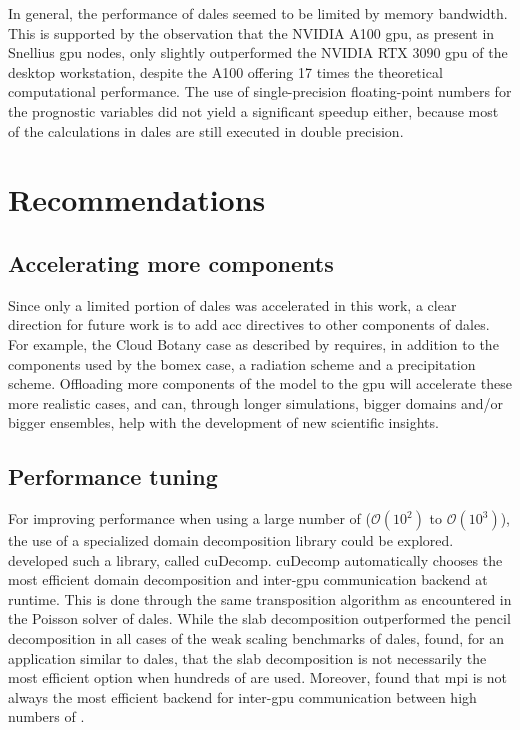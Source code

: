 In general, the performance of \acrshort{dales} seemed to be limited by memory bandwidth. This is supported by the observation that the NVIDIA A100 \acrshort{gpu}, as present in Snellius \acrshort{gpu} nodes, only slightly outperformed the NVIDIA RTX 3090 \acrshort{gpu} of the desktop workstation, despite the A100 offering 17 times the theoretical computational performance. The use of single-precision floating-point numbers for the prognostic variables did not yield a significant speedup either, because most of the calculations in \acrshort{dales} are still executed in double precision.

\section{Recommendations}

\subsection{Accelerating more components}
Since only a limited portion of \acrshort{dales} was accelerated in this work, a clear direction for future work is to add \acrshort{acc} directives to other components of \acrshort{dales}. For example, the Cloud Botany case as described by \citet{janssonCloudBotanyShallow2023} requires, in addition to the components used by the \acrshort{bomex} case, a radiation scheme and a precipitation scheme. Offloading more components of the model to the \acrshort{gpu} will accelerate these more realistic cases, and can, through longer simulations, bigger domains and/or bigger ensembles, help with the development of new scientific insights.
  
\subsection{Performance tuning}

For improving performance when using a large number of  ($\mathcal{O}(10^2)$ to $\mathcal{O}(10^3)$), the use of a specialized domain decomposition library could be explored. \citet{romeroDistributedmemorySimulationsTurbulent2022} developed such a library, called cuDecomp. cuDecomp automatically chooses the most efficient domain decomposition and inter-\acrshort{gpu} communication backend at runtime. This is done through the same transposition algorithm as encountered in the Poisson solver of \acrshort{dales}. While the slab decomposition outperformed the pencil decomposition in all cases of the weak scaling benchmarks of \acrshort{dales}, \citet{romeroDistributedmemorySimulationsTurbulent2022} found, for an application similar to \acrshort{dales}, that the slab decomposition is not necessarily the most efficient option when hundreds of  are used. Moreover, \citet{romeroDistributedmemorySimulationsTurbulent2022} found that \acrshort{mpi} is not always the most efficient backend for inter-\acrshort{gpu} communication between high numbers of .

